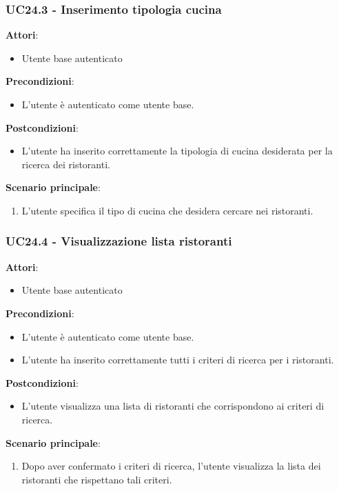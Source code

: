 \subsubsection{UC24.3 - Inserimento tipologia cucina
}\label{usecase:24_3}
\textbf{Attori}:
\begin{itemize}
    \item Utente base autenticato
\end{itemize}
\textbf{Precondizioni}:
\begin{itemize}
    \item L'utente è autenticato come utente base.
\end{itemize}
\textbf{Postcondizioni}:
\begin{itemize}
    \item L'utente ha inserito correttamente la tipologia di cucina desiderata per la ricerca dei ristoranti.
\end{itemize}
\textbf{Scenario principale}:
\begin{enumerate}
    \item L'utente specifica il tipo di cucina che desidera cercare nei ristoranti.
\end{enumerate}


\subsubsection{UC24.4 - Visualizzazione lista ristoranti
}\label{usecase:24_4}
\textbf{Attori}:
\begin{itemize}
    \item Utente base autenticato
\end{itemize}
\textbf{Precondizioni}:
\begin{itemize}
    \item L'utente è autenticato come utente base.
    \item L'utente ha inserito correttamente tutti i criteri di ricerca per i ristoranti.
\end{itemize}
\textbf{Postcondizioni}:
\begin{itemize}
    \item L'utente visualizza una lista di ristoranti che corrispondono ai criteri di ricerca.
\end{itemize}
\textbf{Scenario principale}:
\begin{enumerate}
    \item Dopo aver confermato i criteri di ricerca, l'utente visualizza la lista dei ristoranti che rispettano tali criteri.
\end{enumerate}



\newpage